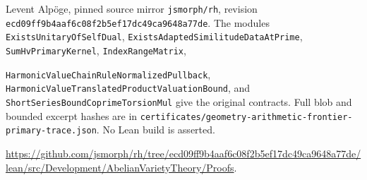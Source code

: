 Levent Alp\"oge, pinned source mirror \texttt{jsmorph/rh}, revision
\texttt{ecd09ff9b4aaf6c08f2b5ef17dc49ca9648a77de}.
The modules \texttt{ExistsUnitaryOfSelfDual},
\texttt{ExistsAdaptedSimilitudeDataAtPrime}, \texttt{SumHvPrimaryKernel},
\texttt{IndexRangeMatrix},\par
\texttt{HarmonicValueChainRuleNormalizedPullback},
\texttt{HarmonicValueTranslatedProductValuationBound}, and
\texttt{ShortSeriesBoundCoprimeTorsionMul} give the original contracts.
Full blob and bounded excerpt hashes are in
\texttt{certificates/geometry-arithmetic-frontier-primary-trace.json}.
No Lean build is asserted.\par
\url{https://github.com/jsmorph/rh/tree/ecd09ff9b4aaf6c08f2b5ef17dc49ca9648a77de/lean/src/Development/AbelianVarietyTheory/Proofs}.
